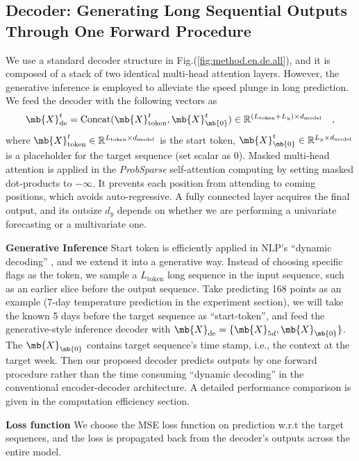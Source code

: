 \subsection{Decoder: Generating Long Sequential Outputs Through One Forward Procedure}
\label{sec:method.decoder}
We use a standard decoder structure \cite{vaswani2017attention} in Fig.(\ref{fig:method.en.de.all}), and it is composed of a stack of two identical multi-head attention layers. However, the generative inference is employed to alleviate the speed plunge in long prediction. We feed the decoder with the following vectors as
\begin{equation}\label{eq.method.de_in}
    \mb{X}^t_{\textrm{de}} = \textrm{Concat} ( \mb{X}^t_{\textrm{token}}, \mb{X}^t_{\mb{0}}  ) \in \mathbb{R}^{(L_{\textrm{token}} + L_y) \times d_{\textrm{model}}} \quad,
\end{equation}
where $\mb{X}^t_{\textrm{token}} \in \mathbb{R}^{L_{\textrm{token}} \times d_{\textrm{model}}}$ is the start token, $\mb{X}^t_{\mb{0}} \in \mathbb{R}^{L_y \times d_{\textrm{model}}} $ is a placeholder for the target sequence (set scalar as 0).
Masked multi-head attention is applied in the \emph{ProbSparse} self-attention computing by setting masked dot-products to $-\infty$. It prevents each position from attending to coming positions, which avoids auto-regressive. A fully connected layer acquires the final output, and its outsize $d_y$ depends on whether we are performing a univariate forecasting or a multivariate one.

\textbf{Generative Inference} Start token is efficiently applied in NLP's ``dynamic decoding'' \cite{devlin2018bert}, and we extend it into a generative way. Instead of choosing specific flags as the token, we sample a $L_{\textrm{token}}$ long sequence in the input sequence, such as an earlier slice before the output sequence.
Take predicting 168 points as an example (7-day temperature prediction in the experiment section), we will take the known 5 days before the target sequence as ``start-token'', and feed the generative-style inference decoder with $\mb{X}_{\textrm{de}}=\{\mb{X}_{5d},\mb{X}_{\mb{0}}\}$. The $\mb{X}_{\mb{0}}$ contains target sequence's time stamp, i.e., the context at the target week.
Then our proposed decoder predicts outputs by one forward procedure rather than the time consuming ``dynamic decoding'' in the conventional encoder-decoder architecture. A detailed performance comparison is given in the computation efficiency section.

\textbf{Loss function}
We choose the MSE loss function on prediction w.r.t the target sequences, and the loss is propagated back from the decoder's outputs across the entire model.

